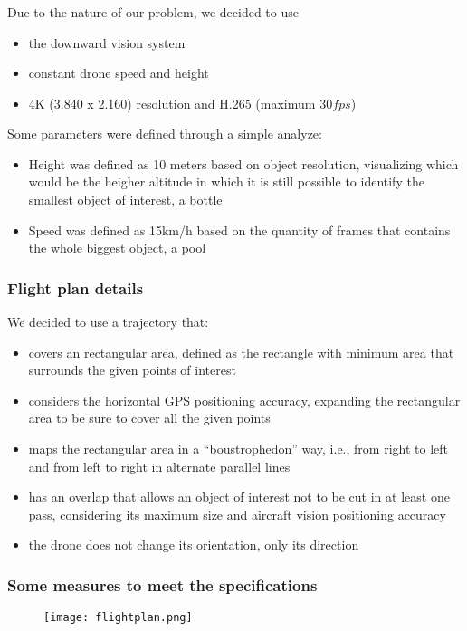 \documentclass{beamer}
\begin{document}
		\begin{frame}\frametitle{}
			Due to the nature of our problem, we decided to use
			\begin{itemize}
				\item the downward vision system
				\item constant drone speed and height
				\item 4K (3.840 x 2.160) resolution and H.265 (maximum $30fps$)
			\end{itemize}

			\bigskip

			Some parameters were defined through a simple analyze:
			\begin{itemize}
				\item Height was defined as 10 meters based on object resolution, visualizing which would be the heigher altitude in which it is still possible to identify the smallest object of interest, a bottle
				\item Speed was defined as 15km/h based on the quantity of frames that contains the whole biggest object, a pool
			\end{itemize}
		\end{frame}


		\begin{frame}\frametitle{Flight plan details}
			We decided to use a trajectory that:
			\begin{itemize}
				\item covers an rectangular area, defined as the rectangle with minimum area that surrounds the given points of interest
				\item considers the horizontal GPS positioning accuracy, expanding the rectangular area to be sure to cover all the given points
				\item maps the rectangular area in a ``boustrophedon'' way, i.e., from right to left and from left to right in alternate parallel lines
				\item has an overlap that allows an object of interest not to be cut in at least one pass, considering its maximum size and aircraft vision positioning accuracy
				\item the drone does not change its orientation, only its direction
			\end{itemize}
		\end{frame}


		\begin{frame}
			\frametitle{Some measures to meet the specifications}
			\begin{figure}
				\centering
				\texttt{[image: flightplan.png]}
			\end{figure}
		\end{frame}
\end{document}
